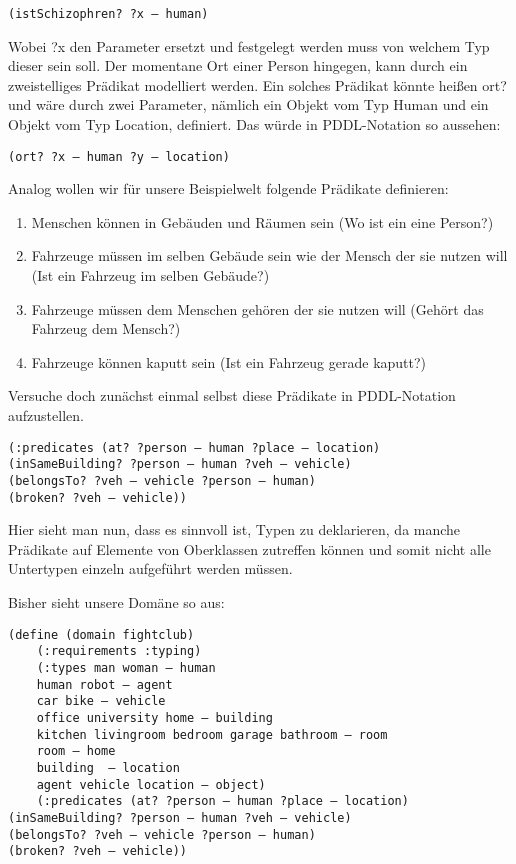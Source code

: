 \documentclass[koma,DIV=1,BCOR=1mm]{article}
\begin{document}
\begin{verbatim}
(istSchizophren? ?x – human)
\end{verbatim}

Wobei ?x den Parameter ersetzt und festgelegt werden muss von welchem
Typ dieser sein soll. Der momentane Ort einer Person hingegen, kann
durch ein zweistelliges Prädikat modelliert werden. Ein solches
Prädikat könnte heißen ort? und wäre durch zwei Parameter, nämlich ein
Objekt vom Typ Human und ein Objekt vom Typ Location, definiert. Das
würde in PDDL-Notation so aussehen:

\begin{verbatim}
(ort? ?x – human ?y – location)
\end{verbatim}

Analog wollen wir für unsere Beispielwelt folgende Prädikate
definieren:

\begin{enumerate}
\item Menschen können in Gebäuden und Räumen sein (Wo ist ein eine Person?)
\item Fahrzeuge müssen im selben Gebäude sein wie der Mensch der sie nutzen will (Ist ein Fahrzeug im selben Gebäude?)
\item Fahrzeuge müssen dem Menschen gehören der sie nutzen will (Gehört das Fahrzeug dem Mensch?)
\item Fahrzeuge können kaputt sein (Ist ein Fahrzeug gerade kaputt?)
\end{enumerate}

Versuche doch zunächst einmal selbst diese Prädikate in PDDL-Notation
aufzustellen.

\begin{verbatim}
(:predicates (at? ?person – human ?place – location)
(inSameBuilding? ?person – human ?veh – vehicle)
(belongsTo? ?veh – vehicle ?person – human)
(broken? ?veh – vehicle))
\end{verbatim}

Hier sieht man nun, dass es sinnvoll ist, Typen zu deklarieren, da
manche Prädikate auf Elemente von Oberklassen zutreffen können und
somit nicht alle Untertypen einzeln aufgeführt werden müssen.

Bisher sieht unsere Domäne so aus:

\begin{verbatim}
(define (domain fightclub)
	(:requirements :typing)
	(:types man woman – human
	human robot – agent 
	car bike – vehicle
	office university home – building
	kitchen livingroom bedroom garage bathroom – room
	room – home 
	building  – location 
	agent vehicle location – object)
	(:predicates (at? ?person – human ?place – location)
(inSameBuilding? ?person – human ?veh – vehicle)
(belongsTo? ?veh – vehicle ?person – human)
(broken? ?veh – vehicle))
\end{verbatim}
\end{document}
